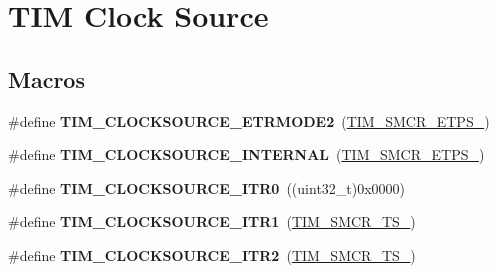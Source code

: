 \hypertarget{group___t_i_m___clock___source}{}\section{T\+IM Clock Source}
\label{group___t_i_m___clock___source}
\subsection*{Macros}
\begin{DoxyCompactItemize}
\item 
\#define {\bfseries T\+I\+M\+\_\+\+C\+L\+O\+C\+K\+S\+O\+U\+R\+C\+E\+\_\+\+E\+T\+R\+M\+O\+D\+E2}~(\hyperlink{group___peripheral___registers___bits___definition_gabf12f04862dbc92ca238d1518b27b16b}{T\+I\+M\+\_\+\+S\+M\+C\+R\+\_\+\+E\+T\+P\+S\+\_})\hypertarget{group___t_i_m___clock___source_gab133f0839cf6a4e858457d48f057eea8}{}\label{group___t_i_m___clock___source_gab133f0839cf6a4e858457d48f057eea8}

\item 
\#define {\bfseries T\+I\+M\+\_\+\+C\+L\+O\+C\+K\+S\+O\+U\+R\+C\+E\+\_\+\+I\+N\+T\+E\+R\+N\+AL}~(\hyperlink{group___peripheral___registers___bits___definition_ga00b43cd09557a69ed10471ed76b228d8}{T\+I\+M\+\_\+\+S\+M\+C\+R\+\_\+\+E\+T\+P\+S\+\_})\hypertarget{group___t_i_m___clock___source_ga9b398a201d8b6a4f200ebde86b1d8f3a}{}\label{group___t_i_m___clock___source_ga9b398a201d8b6a4f200ebde86b1d8f3a}

\item 
\#define {\bfseries T\+I\+M\+\_\+\+C\+L\+O\+C\+K\+S\+O\+U\+R\+C\+E\+\_\+\+I\+T\+R0}~((uint32\+\_\+t)0x0000)\hypertarget{group___t_i_m___clock___source_ga3310aa84f2f322eb77538997c070e56a}{}\label{group___t_i_m___clock___source_ga3310aa84f2f322eb77538997c070e56a}

\item 
\#define {\bfseries T\+I\+M\+\_\+\+C\+L\+O\+C\+K\+S\+O\+U\+R\+C\+E\+\_\+\+I\+T\+R1}~(\hyperlink{group___peripheral___registers___bits___definition_ga8d1f040f9259acb3c2fba7b0c7eb3d96}{T\+I\+M\+\_\+\+S\+M\+C\+R\+\_\+\+T\+S\+\_})\hypertarget{group___t_i_m___clock___source_gae2da814f8d86491e7c344bb8d0f62b96}{}\label{group___t_i_m___clock___source_gae2da814f8d86491e7c344bb8d0f62b96}

\item 
\#define {\bfseries T\+I\+M\+\_\+\+C\+L\+O\+C\+K\+S\+O\+U\+R\+C\+E\+\_\+\+I\+T\+R2}~(\hyperlink{group___peripheral___registers___bits___definition_gacb82212fcc89166a43ff97542da9182d}{T\+I\+M\+\_\+\+S\+M\+C\+R\+\_\+\+T\+S\+\_})\hypertarget{group___t_i_m___clock___source_gafb779719a41769b14303da4977f6a5f1}{}\label{group___t_i_m___clock___source_gafb779719a41769b14303da4977f6a5f1}


\end{DoxyCompactItemize}
